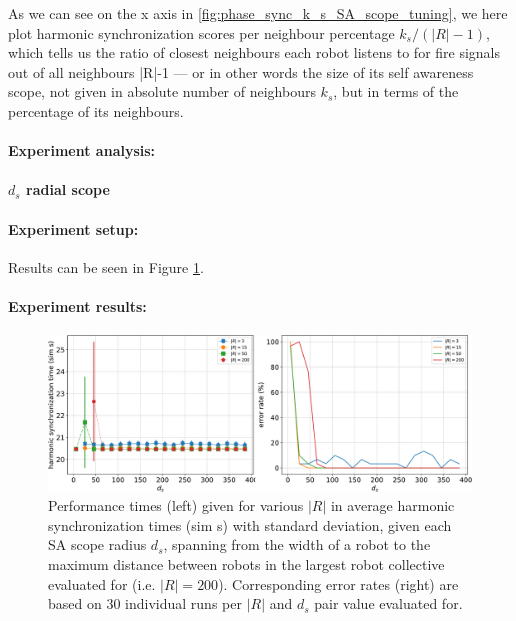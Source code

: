 				As we can see on the x axis in \ref{fig:phase_sync_k_s_SA_scope_tuning}, we here plot harmonic synchronization scores per neighbour percentage $k_s/(|R|-1)$, which tells us the ratio of closest neighbours each robot listens to for fire signals out of all neighbours |R|-1 — or in other words the size of its self awareness scope, not given in absolute number of neighbours $k_s$, but in terms of the percentage of its neighbours.
				
				\paragraph{Experiment analysis:\nl}
				 
				 
			\paragraph{$d_s$ radial scope}
			
				\paragraph{Experiment setup:\nl}
				
				Results can be seen in Figure \ref{fig:phase_sync_d_s_SA_scope_tuning}.
				
				\paragraph{Experiment results:\nl}
				
				\begin{figure}[ht!]
					\centering
					\includegraphics[width=\linewidth]{Assets/DocSegments/Chapters/ExperimentsAndResults/Figures/PerfScores/phase_sync_d_s_SA_scope_tuning_experiment_performance.pdf}
					\caption[Experiment results for $\phi$ synchronization $d_s$ SA scope tuning experiment.]{Performance times (left) given for various $|R|$ in average harmonic synchronization times (sim s) with standard deviation, given each SA scope radius $d_s$, spanning from the width of a robot to the maximum distance between robots in the largest robot collective evaluated for (i.e. $|R|=200$). Corresponding error rates (right) are based on 30 individual runs per $|R|$ and $d_s$ pair value evaluated for.}
					\label{fig:phase_sync_d_s_SA_scope_tuning}
				\end{figure}
				

